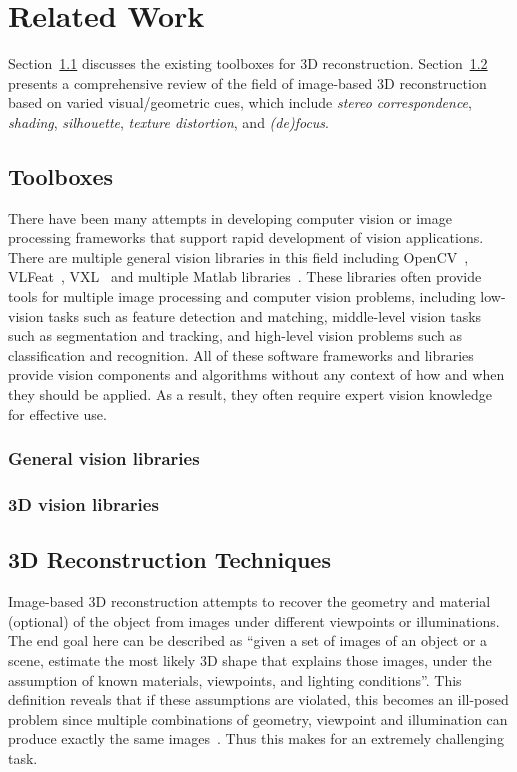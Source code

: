 
\chapter{Related Work}
\label{ch:RelatedWork}
Section~\ref{sec:Toolbox} discusses the existing toolboxes for 3D reconstruction. Section~\ref{sec:3DRecon_Tech} presents a comprehensive review of the field of image-based 3D reconstruction based on varied visual/geometric cues, which include \textit{stereo correspondence}, \textit{shading}, \textit{silhouette}, \textit{texture distortion}, and \textit{(de)focus}.

\section{Toolboxes}
\label{sec:Toolbox}
There have been many attempts in developing computer vision or image processing frameworks that support rapid development of vision applications. There are multiple general vision libraries in this field including OpenCV~\cite{bradski2008learning}, VLFeat~\cite{vedaldi08vlfeat}, VXL~\cite{vxl17} and multiple Matlab libraries~\cite{KovesiMATLABCode, MariottiniPr_RAM05}. These libraries often provide tools for multiple image processing and computer vision problems, including low-vision tasks such as feature detection and matching, middle-level vision tasks such as segmentation and tracking, and high-level vision problems such as classification and recognition. All of these software frameworks and libraries provide vision components and algorithms without any context of how and when they should be applied. As a result, they often require expert vision knowledge for effective use.

\subsection{General vision libraries}

\subsection{3D vision libraries}


\section{3D Reconstruction Techniques}
\label{sec:3DRecon_Tech}
Image-based 3D reconstruction attempts to recover the geometry and material (optional) of the object from images under different viewpoints or illuminations. The end goal here can be described as ``given a set of images of an object or a scene, estimate the most likely 3D shape that explains those images, under the assumption of known materials, viewpoints, and lighting conditions''. This definition reveals that if these assumptions are violated, this becomes an ill-posed problem since multiple combinations of geometry, viewpoint and illumination can produce exactly the same images~\cite{poggio1985computational}. Thus this makes for an extremely challenging task.

